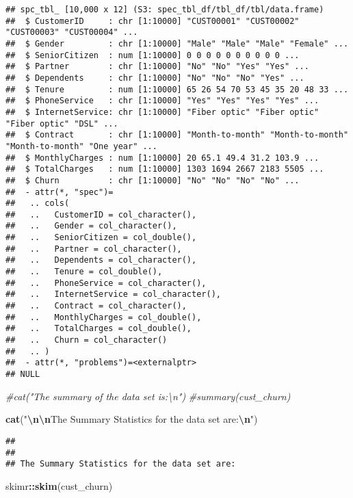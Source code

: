 \documentclass[
]{article}
\newenvironment{Shaded}{\begin{snugshade}}{\end{snugshade}}
\newcommand{\CommentTok}[1]{\textcolor[rgb]{0.56,0.35,0.01}{\textit{#1}}}
\newcommand{\FunctionTok}[1]{\textcolor[rgb]{0.13,0.29,0.53}{\textbf{#1}}}
\newcommand{\NormalTok}[1]{#1}
\newcommand{\SpecialCharTok}[1]{\textcolor[rgb]{0.81,0.36,0.00}{\textbf{#1}}}
\newcommand{\StringTok}[1]{\textcolor[rgb]{0.31,0.60,0.02}{#1}}
\begin{document}
\begin{verbatim}
## spc_tbl_ [10,000 x 12] (S3: spec_tbl_df/tbl_df/tbl/data.frame)
##  $ CustomerID     : chr [1:10000] "CUST00001" "CUST00002" "CUST00003" "CUST00004" ...
##  $ Gender         : chr [1:10000] "Male" "Male" "Male" "Female" ...
##  $ SeniorCitizen  : num [1:10000] 0 0 0 0 0 0 0 0 0 0 ...
##  $ Partner        : chr [1:10000] "No" "No" "Yes" "Yes" ...
##  $ Dependents     : chr [1:10000] "No" "No" "No" "Yes" ...
##  $ Tenure         : num [1:10000] 65 26 54 70 53 45 35 20 48 33 ...
##  $ PhoneService   : chr [1:10000] "Yes" "Yes" "Yes" "Yes" ...
##  $ InternetService: chr [1:10000] "Fiber optic" "Fiber optic" "Fiber optic" "DSL" ...
##  $ Contract       : chr [1:10000] "Month-to-month" "Month-to-month" "Month-to-month" "One year" ...
##  $ MonthlyCharges : num [1:10000] 20 65.1 49.4 31.2 103.9 ...
##  $ TotalCharges   : num [1:10000] 1303 1694 2667 2183 5505 ...
##  $ Churn          : chr [1:10000] "No" "No" "No" "No" ...
##  - attr(*, "spec")=
##   .. cols(
##   ..   CustomerID = col_character(),
##   ..   Gender = col_character(),
##   ..   SeniorCitizen = col_double(),
##   ..   Partner = col_character(),
##   ..   Dependents = col_character(),
##   ..   Tenure = col_double(),
##   ..   PhoneService = col_character(),
##   ..   InternetService = col_character(),
##   ..   Contract = col_character(),
##   ..   MonthlyCharges = col_double(),
##   ..   TotalCharges = col_double(),
##   ..   Churn = col_character()
##   .. )
##  - attr(*, "problems")=<externalptr> 
## NULL
\end{verbatim}

\begin{Shaded}
\begin{Highlighting}[]
\CommentTok{\#cat("The summary of the data set is:\textbackslash{}n")}
\CommentTok{\#summary(cust\_churn)}

\FunctionTok{cat}\NormalTok{(}\StringTok{"}\SpecialCharTok{\textbackslash{}n\textbackslash{}n}\StringTok{The Summary Statistics for the data set are:}\SpecialCharTok{\textbackslash{}n}\StringTok{"}\NormalTok{)}
\end{Highlighting}
\end{Shaded}

\begin{verbatim}
## 
## 
## The Summary Statistics for the data set are:
\end{verbatim}

\begin{Shaded}
\begin{Highlighting}[]
\NormalTok{skimr}\SpecialCharTok{::}\FunctionTok{skim}\NormalTok{(cust\_churn)}
\end{Highlighting}
\end{Shaded}
\end{document}
